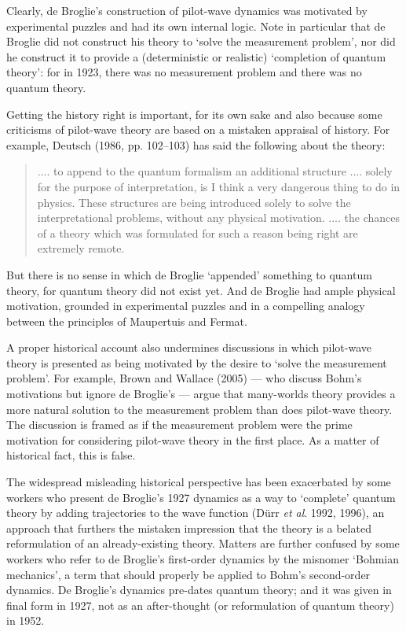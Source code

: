 \documentclass[12pt]{article}%
\begin{document}
Clearly, de Broglie's construction of pilot-wave dynamics was motivated by
experimental puzzles and had its own internal logic. Note in particular that
de Broglie did not construct his theory to `solve the measurement problem',
nor did he construct it to provide a (deterministic or realistic) `completion
of quantum theory': for in 1923, there was no measurement problem and there
was no quantum theory.

Getting the history right is important, for its own sake and also because some
criticisms of pilot-wave theory are based on a mistaken appraisal of history.
For example, Deutsch (1986, pp. 102--103) has said the following about the theory:

\begin{quote}
.... to append to the quantum formalism an additional structure .... solely
for the purpose of interpretation, is I think a very dangerous thing to do in
physics. These structures are being introduced solely to solve the
interpretational problems, without any physical motivation. .... the chances
of a theory which was formulated for such a reason being right are extremely remote.
\end{quote}
But there is no sense in which de Broglie `appended' something to
quantum theory, for quantum theory did not exist yet. And de Broglie had ample
physical motivation, grounded in experimental puzzles and in a compelling
analogy between the principles of Maupertuis and Fermat.

A proper historical account also undermines discussions in which pilot-wave
theory is presented as being motivated by the desire to `solve the measurement
problem'. For example, Brown and Wallace (2005) --- who discuss Bohm's
motivations but ignore de Broglie's --- argue that many-worlds theory provides
a more natural solution to the measurement problem than does pilot-wave
theory. The discussion is framed as if the measurement problem were the prime
motivation for considering pilot-wave theory in the first place. As a matter
of historical fact, this is false.

The widespread misleading historical perspective has been exacerbated by some
workers who present de Broglie's 1927 dynamics as a way to `complete' quantum
theory by adding trajectories to the wave function (D\"{u}rr \textit{et al}.
1992, 1996), an approach that furthers the mistaken impression that the theory
is a belated reformulation of an already-existing theory. Matters are further
confused by some workers who refer to de Broglie's first-order dynamics by the
misnomer `Bohmian mechanics', a term that should properly be applied to Bohm's
second-order dynamics. De Broglie's dynamics pre-dates quantum theory; and it
was given in final form in 1927, not as an after-thought (or reformulation of
quantum theory) in 1952.
\end{document}
